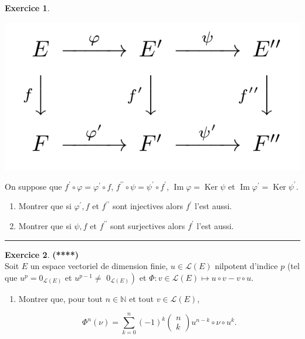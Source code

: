 \documentclass[a4paper,11pt]{article}
\theoremstyle{definition}
\newtheorem{exo}{Exercice} %
\begin{document}
\begin{minipage}{1\linewidth}
\begin{minipage}[t]{0.48\linewidth}
\begin{exo}
		\begin{center}
			\includegraphics[scale=0.4]{image1.png}
		\end{center}
	
		On suppose que $f^{\prime} \circ \varphi=\varphi^{\prime} \circ f$, $f^{\prime \prime} \circ \psi=\psi^{\prime} \circ f^{\prime}$, $\operatorname{Im} \varphi=\operatorname{Ker} \psi$ et $\operatorname{Im} \varphi^{\prime}=\operatorname{Ker} \psi^{\prime}$.
		\begin{enumerate}
			\item Montrer que si $\varphi^{\prime}, f$ et $f^{\prime \prime}$ sont injectives alors $f^{\prime}$ l'est aussi.
			\item Montrer que si $\psi, f$ et $f^{\prime \prime}$ sont surjectives alors $f^{\prime}$ l'est aussi.
		\end{enumerate}
			\centering\rule{1\linewidth}{0.6pt}\end{exo}
		
		
		
		\begin{exo}\textbf{(****)}\quad\\[0.2cm]
			Soit $E$ un espace vectoriel de dimension finie, $u \in \mathscr{L}(E)$ nilpotent d'indice $p$ (tel que $u^{p}=0_{\mathscr{L}(E)}$ et $u^{p-1} \neq$ $\left.0_{\mathscr{L}(E)}\right)$ et $\Phi: v \in \mathscr{L}(E) \mapsto u \circ v-v \circ u$.
			
			\begin{enumerate}
				\item Montrer que, pour tout $n \in \mathbb{N}$ et tout $v \in \mathscr{L}(E)$,
				
				$$
				\Phi^{n}(\nu)=\sum_{k=0}^{n}(-1)^{k}\left(\begin{array}{l}
				n \\
				k
				\end{array}\right) u^{n-k} \circ \nu \circ u^{k} .
				$$\quad\\[0.4cm]
				

\end{enumerate}
\end{exo}
\end{minipage}
\end{minipage}
\end{document}
